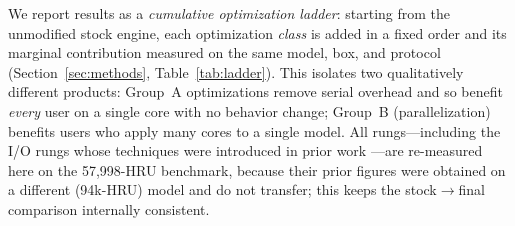 We report results as a \emph{cumulative optimization ladder}: starting from the unmodified
stock engine, each optimization \emph{class} is added in a fixed order and its marginal
contribution measured on the same model, box, and protocol (Section~\ref{sec:methods},
Table~\ref{tab:ladder}). This isolates two qualitatively different products: Group~A
optimizations remove serial overhead and so benefit \emph{every} user on a single core with no
behavior change; Group~B (parallelization) benefits users who apply many cores to a
single model. All rungs---including the I/O rungs whose techniques were introduced in prior work \citep[the NetCDF backend and channel print filter, benchmarked there;][]{Rafiei2026SWATGenX}---are
re-measured here on the 57{,}998-HRU benchmark, because their prior figures were obtained on a
different (94k-HRU) model and do not transfer; this keeps the stock$\rightarrow$final
comparison internally consistent.


